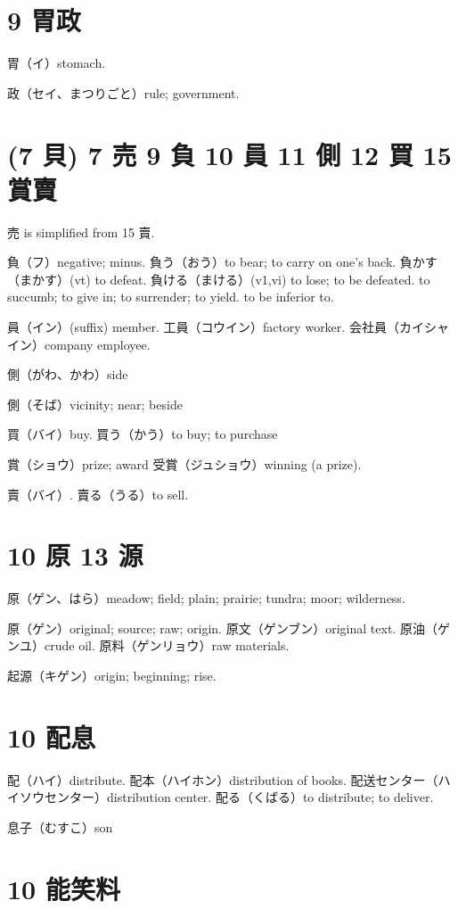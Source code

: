 \section{9 胃政}

胃（イ）stomach.

政（セイ、まつりごと）rule; government.

\section{(7 貝) 7 売 9 負 10 員 11 側 12 買 15 賞賣}

売 is simplified from 15 賣.

負（フ）negative; minus.
負う（おう）to bear; to carry on one's back.
負かす（まかす）(vt) to defeat.
負ける（まける）(v1,vi)
to lose; to be defeated.
to succumb; to give in; to surrender; to yield.
to be inferior to.

員（イン）(suffix) member.
工員（コウイン）factory worker.
会社員（カイシャイン）company employee.

側（がわ、かわ）side

側（そば）vicinity; near; beside

買（バイ）buy.
買う（かう）to buy; to purchase

賞（ショウ）prize; award
受賞（ジュショウ）winning (a prize).

賣（バイ）.
賣る（うる）to sell.

\section{10 原 13 源}

原（ゲン、はら）meadow; field; plain; prairie; tundra; moor; wilderness.

原（ゲン）original; source; raw; origin.
原文（ゲンブン）original text.
原油（ゲンユ）crude oil.
原料（ゲンリョウ）raw materials.

起源（キゲン）origin; beginning; rise.

\section{10 配息}

配（ハイ）distribute.
配本（ハイホン）distribution of books.
配送センター（ハイソウセンター）distribution center.
配る（くばる）to distribute; to deliver.

息子（むすこ）son

\section{10 能笑料}

